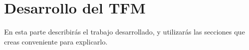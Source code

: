 \chapter{Desarrollo del TFM}\label{chapter:desarrollo}

En esta parte describirás el trabajo desarrollado, y utilizarás las secciones que creas conveniente para explicarlo.

